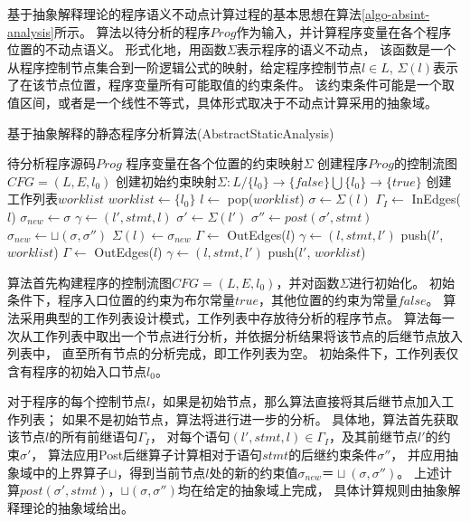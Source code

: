 基于抽象解释理论的程序语义不动点计算过程的基本思想在算法\ref{algo-absint-analysis}所示。
算法以待分析的程序$Prog$作为输入，并计算程序变量在各个程序位置的不动点语义。
形式化地，用函数$\Sigma$表示程序的语义不动点，
该函数是一个从程序控制节点集合到一阶逻辑公式的映射，给定程序控制节点$l\in L$,
$\Sigma(l)$表示了在该节点位置，程序变量所有可能取值的约束条件。
该约束条件可能是一个取值区间，或者是一个线性不等式，具体形式取决于不动点计算采用的抽象域。


\begin{algorithm}[h]
\renewcommand{\algorithmicrequire}{\textbf{Input:}}
\renewcommand{\algorithmicensure}{\textbf{Output:}}
\caption{基于抽象解释的静态程序分析算法(AbstractStaticAnalysis)}
\label{algo-absint-analysis}
\begin{algorithmic}[1]
\REQUIRE 待分析程序源码$Prog$
\ENSURE 程序变量在各个位置的约束映射$\Sigma$
\STATE 创建程序$Prog$的控制流图$CFG=(L, E, l_0)$
\STATE 创建初始约束映射$\Sigma : L/\{l_0\} \rightarrow \{false\} \bigcup \{l_0\} \rightarrow \{true\}$
\STATE 创建工作列表$worklist$
\STATE $worklist \gets \{l_{0}\}$
	\STATE $l \gets $ pop($worklist$)
	\STATE $\sigma \gets \Sigma(l)$
		\STATE $\Gamma_I \gets $ InEdges($l$)
		\STATE $\sigma_{new} \gets \sigma$
			\STATE $\gamma \gets (l',stmt,l)$
			\STATE $\sigma' \gets \Sigma(l')$
			\STATE $\sigma'' \gets post(\sigma', stmt)$
			\STATE $\sigma_{new} \gets \sqcup(\sigma, \sigma'')$
		\ENDFOR
			\STATE $\Sigma(l) \gets \sigma_{new}$
			\STATE $\Gamma \gets $ OutEdges($l$)
			\FOR{$\gamma \in \Gamma$}
				\STATE $\gamma \gets (l, stmt, l')$
				\STATE push($l'$, $worklist$)
			\ENDFOR
		\ENDIF
	\ELSE
		\STATE $\Gamma \gets $ OutEdges($l$)
		\FOR{$\gamma \in \Gamma$}
			\STATE $\gamma \gets (l, stmt, l')$
			\STATE push($l'$, $worklist$)
		\ENDFOR
	\ENDIF
\ENDWHILE
\end{algorithmic}
\end{algorithm}

算法首先构建程序的控制流图$CFG=(L, E, l_0)$，并对函数$\Sigma$进行初始化。
初始条件下，程序入口位置的约束为布尔常量$true$，其他位置的约束为常量$false$。
算法采用典型的工作列表设计模式，工作列表中存放待分析的程序节点。
算法每一次从工作列表中取出一个节点进行分析，并依据分析结果将该节点的后继节点放入列表中，
直至所有节点的分析完成，即工作列表为空。
初始条件下，工作列表仅含有程序的初始入口节点$l_0$。

对于程序的每个控制节点$l$，如果是初始节点，那么算法直接将其后继节点加入工作列表；
如果不是初始节点，算法将进行进一步的分析。
具体地，算法首先获取该节点$l$的所有前继语句$\Gamma_{I}$，
对每个语句$(l',stmt,l)\in \Gamma_{I}$，及其前继节点$l'$的约束$\sigma'$，
算法应用Post后继算子计算相对于语句$stmt$的后继约束条件$\sigma''$，
并应用抽象域中的上界算子$\sqcup$，得到当前节点$l$处的新的约束值$\sigma_{new}　＝　
\sqcup(\sigma,\sigma'')$。
上述计算$post(\sigma', stmt)$，$\sqcup(\sigma,\sigma'')$均在给定的抽象域上完成，
具体计算规则由抽象解释理论的抽象域给出。

